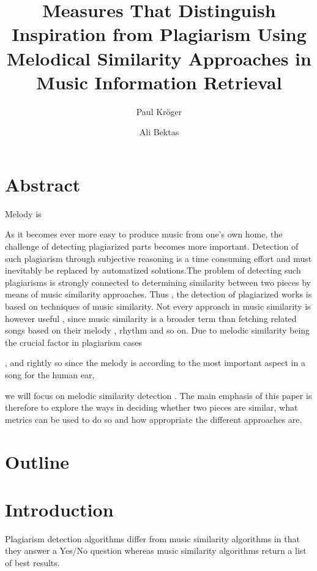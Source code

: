 \documentclass{article}
\author{Paul Kröger \and Ali Bektas}
\title{Measures That Distinguish Inspiration from Plagiarism Using Melodical Similarity Approaches in Music Information Retrieval}
\begin{document}
	\maketitle

	\section*{Abstract} 

	Melody is 

	As it becomes ever more easy to produce music from one's own home, the challenge of detecting plagiarized 
	parts becomes more important. Detection of such plagiarism through subjective reasoning is a time consuming 
	effort and must inevitably be replaced by automatized solutions.The problem of detecting such plagiarisms 
	is strongly connected to determining similarity between two pieces by means of music similarity approaches. 
	Thus , the detection of plagiarized works is based on techniques of music similarity. Not every 
	approach in music similarity is however useful , since music similarity is a broader term than fetching 
	related songs based on their melody , rhythm and so on. 
	Due to melodic similarity being the crucial factor in plagiarism cases \cite{one_point_one}
	

	, and rightly so since the 
	melody is according to \cite{lost} the most important aspect in a song for the human ear,

	 
	we will focus on melodic similarity detection . The main emphasis of this paper is therefore to 
	explore the ways in deciding whether two pieces are similar, what metrics can be used to do so and how 
	appropriate the different approaches are.  
	
	\section*{Outline}


	\section*{Introduction}
		Plagiarism detection algorithms differ from music similarity algorithms in that they answer a Yes/No question whereas music similarity algorithms return a list of best results.
\end{document}
